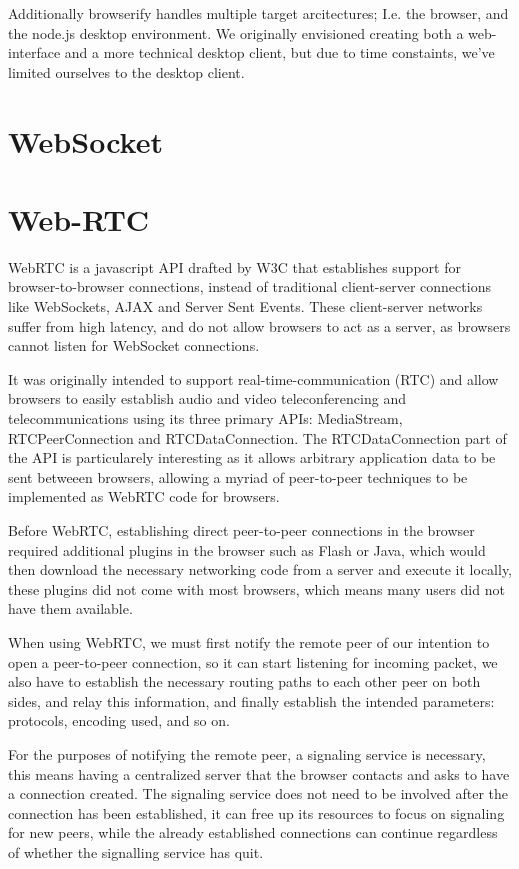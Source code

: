 Additionally browserify handles multiple target arcitectures; I.e. the browser,
and the node.js desktop environment. We originally envisioned creating both a 
web-interface and a more technical desktop client, but due to time constaints,
we've limited ourselves to the desktop client.

\section{WebSocket}


\section{Web-RTC}
WebRTC is a javascript \acs{API} drafted by W3C that establishes support for browser-to-browser connections,
instead of traditional client-server connections like WebSockets, AJAX and Server Sent Events.
These client-server networks suffer from high latency, and do not allow browsers to act as a server,
as browsers cannot listen for WebSocket connections.

It was originally intended to support real-time-communication (RTC) 
and allow browsers to easily establish audio and video teleconferencing and telecommunications
using its three primary \acs{API}s: MediaStream, R\acs{TCP}eerConnection and RTCDataConnection.
The RTCDataConnection part of the \acs{API} is particularely interesting
as it allows arbitrary application data to be sent betweeen browsers,
allowing a myriad of peer-to-peer techniques to be implemented as WebRTC code for browsers.

Before WebRTC, establishing direct peer-to-peer connections in the browser required
additional plugins in the browser such as Flash or Java, which would then download the necessary networking code
from a server and execute it locally,
these plugins did not come with most browsers,
which means many users did not have them available.
\newline

\label{webrtc-connection-server}
When using WebRTC, we must first notify the remote peer of our intention
to open a peer-to-peer connection, so it can start listening for incoming packet,
we also have to establish the necessary routing paths to each other peer on both sides,
and relay this information,
and finally establish the intended parameters: protocols, encoding used, and so on.

For the purposes of notifying the remote peer, a signaling service is necessary,
this means having a centralized server that the browser contacts and asks to have a connection created.
The signaling service does not need to be involved after the connection has been established,
it can free up its resources to focus on signaling for new peers, 
while the already established connections can continue regardless of whether the signalling service has quit.

